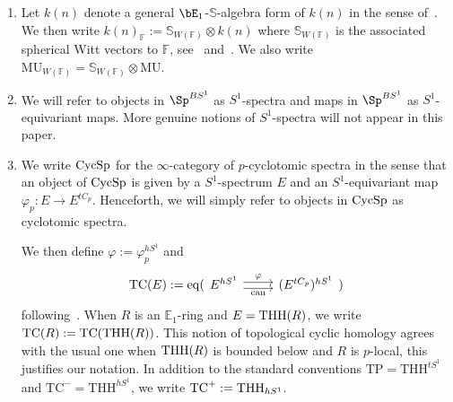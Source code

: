 \documentclass[english,10pt]{amsart}
\newcommand{\bS}{\mathbb{S}}
\newcommand{\field}{\mathbb{F}}
\theoremstyle{definition}
\numberwithin{equation}{section}
\DeclareMathOperator{\equalizer}{eq}
\DeclareMathOperator{\TC}{TC}
\DeclareMathOperator{\thh}{\ensuremath{\textup{THH}}}
\newcommand{\THH}{\thh}
\DeclareMathOperator{\cycsp}{\ensuremath{\textup{CycSp}}}
\newcommand{\cC}{\mathcal{C}}
\newcommand{\gr}{\textup{gr}^*}
\begin{document}
\begin{enumerate}
Similarly, let $\mathrm{Gr}(\cC)=\mathrm{Fun}(\mathbb{N}^{\textup{ds}},\cC)$. 
We refer to the objects of $\mathrm{Gr}(\cC)$ as graded objects or $\mathbb{N}$-graded objects of $\cC$. We write $\mathrm{Fun}(\mathbb{Z}^{\textup{ds}},\cC)$ and refer to objects in this category as $\mathbb{Z}$-graded objects in $\mathcal{C}$. In each case, we write $I^i:=I^*(i)$ and refer to $i$ as the \emph{weight} and $I^i$ as the \emph{weight $i$ component}. 

We write $\gr :\mathrm{Tow}(\cC) \to \mathrm{Gr}(\cC)$ and  $\gr :\mathrm{Fil}(\cC) \to \Fun(\mathbb{Z}^{\textup{ds}},\cC)$ for the associated graded functors. 

If $\cC$ is presentably symmetric monoidal, we equip $\mathrm{Tow}(\cC)$,  $\mathrm{Fil}(\cC)$, $\mathrm{Gr}(\cC)$ and $\Fun(\mathbb{Z}^{\textup{ds}},\cC)$ with the Day convolution symmetric monoidal structure~\cite{glasman2016dayconv}. Recall that $\gr$ is symmetric monoidal with respect to Day convolution. 

\item Let $k(n)$ denote a general $\bE_1$-$\bS$-algebra form of $k(n)$ in the sense of~\cite[Definition~A.1.1]{angelini2024syntomic}. 
We then write $k(n)_{\field}:=\bS_{W(\field)}\otimes k(n)$ where $ \bS_{W(\field)}$ is the associated spherical Witt vectors to $\field$, see~\cite[Example~5.2.67]{lurie2018ellipticII} and~\cite[\S~2.1]{BSY22}. We also write $\mathrm{MU}_{W(\field)}=\bS_{W(\field)}\otimes \mathrm{MU}$. 

\item We will refer to objects in $\Sp^{BS^1}$ as $S^1$-spectra and maps in $\Sp^{BS^1}$ as $S^1$-equivariant maps. More genuine notions of $S^1$-spectra will not appear in this paper.
\item We write $\cycsp$ for the $\infty$-category of $p$-cyclotomic spectra in the sense that an object of $\cycsp$ is given by a $S^1$-spectrum $E$ and an $S^1$-equivariant map $\varphi_p :E\to E^{tC_p}$. Henceforth, we will simply refer to objects in $\cycsp$ as cyclotomic spectra. 

We then define $\varphi := \varphi_p^{hS^1}$ and 
\[ 
\TC(E):=\equalizer(
\begin{tikzcd} 
E^{hS^1}
\arrow[r,shift right,"\textup{can}",swap] 
\arrow[r,shift left,"\varphi"]  & (E^{tC_p})^{hS^1}
\end{tikzcd}
)
\]
following~\cite{nikolausscholze2018topologicalcyclic}. When $R$ is an $\mathbb{E}_1$-ring and $E=\THH(R)$, we write $\mathrm{TC}(R):=\mathrm{TC}(\THH(R))$. This notion of topological cyclic homology agrees with the usual one when $\THH(R)$ is bounded below and $R$ is $p$-local, this justifies our notation. In  addition to the standard conventions $\mathrm{TP}=\mathrm{THH}^{tS^1}$ and $\mathrm{TC}^{-}=\mathrm{THH}^{hS^1}$, we write $\TC^{+}:=\THH_{hS^1}$.
\end{enumerate}
\end{document}
